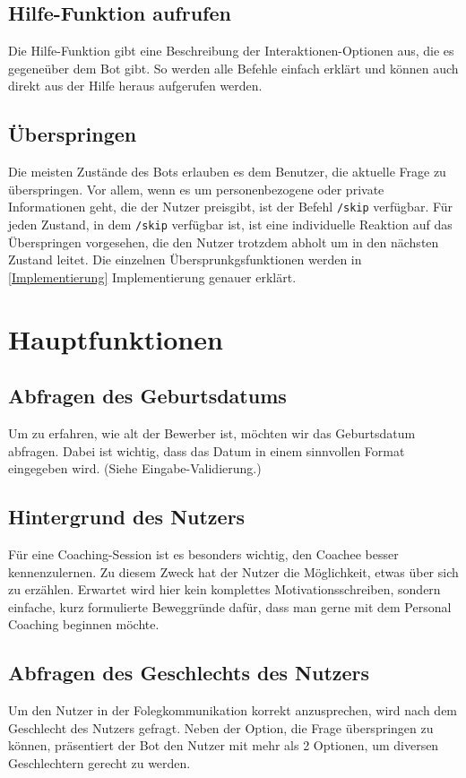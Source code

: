         \subsection{Hilfe-Funktion aufrufen}
            Die Hilfe-Funktion gibt eine Beschreibung der Interaktionen-Optionen aus, die es gegeneüber dem Bot gibt. So werden alle Befehle einfach erklärt und können auch direkt aus der Hilfe heraus aufgerufen werden. 

        \subsection{Überspringen}
            Die meisten Zustände des Bots erlauben es dem Benutzer, die aktuelle Frage zu überspringen. Vor allem, wenn es um personenbezogene oder private Informationen geht, die der Nutzer preisgibt, ist der Befehl \verb|/skip| verfügbar. Für jeden Zustand, in dem \verb|/skip| verfügbar ist, ist eine individuelle Reaktion auf das Überspringen vorgesehen, die den Nutzer trotzdem abholt um in den nächsten Zustand leitet. Die einzelnen Übersprunkgsfunktionen werden in \ref{Implementierung} Implementierung genauer erklärt.

    \section{Hauptfunktionen}

        \subsection{Abfragen des Geburtsdatums}    
            Um zu erfahren, wie alt der Bewerber ist, möchten wir das Geburtsdatum abfragen. Dabei ist wichtig, dass das Datum in einem sinnvollen Format eingegeben wird. (Siehe Eingabe-Validierung.)

        \subsection{Hintergrund des Nutzers}
            Für eine Coaching-Session ist es besonders wichtig, den Coachee besser kennenzulernen. Zu diesem Zweck hat der Nutzer die Möglichkeit, etwas über sich zu erzählen. Erwartet wird hier kein komplettes Motivationsschreiben, sondern einfache, kurz formulierte Beweggründe dafür, dass man gerne mit dem Personal Coaching beginnen möchte. 
        
        \subsection{Abfragen des Geschlechts des Nutzers}
            Um den Nutzer in der Folegkommunikation korrekt anzusprechen, wird nach dem Geschlecht des Nutzers gefragt. Neben der Option, die Frage überspringen zu können, präsentiert der Bot den Nutzer mit mehr als 2 Optionen, um diversen Geschlechtern gerecht zu werden.
        
